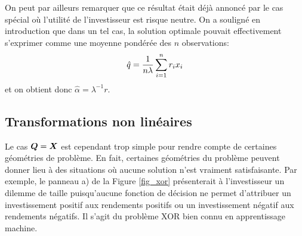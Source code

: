 On peut par ailleurs remarquer que ce résultat était déjà annoncé par le cas spécial où
l'utilité de l'investisseur est risque neutre. On a souligné en introduction que dans un
tel cas, la solution optimale pouvait effectivement s'exprimer comme une moyenne pondérée
des $n$ observations:
\begin{equation}
  \hat q = \frac{1}{n\lambda}\sum_{i=1}^n r_i x_i
\end{equation}
et on obtient donc $\hat\alpha = \lambda^{-1}r$. 



\subsection{Transformations non linéaires}



Le cas $\bm Q = \bm{X}$ est cependant trop simple pour rendre compte de certaines géométries de
problème. En fait, certaines géométries du problème peuvent donner lieu à des situations
où aucune solution n'est vraiment satisfaisante. Par exemple, le panneau a) de la Figure
\ref{fig_xor} présenterait à l'investisseur un dilemme de taille puisqu'aucune fonction de
décision ne permet d'attribuer un investissement positif aux rendements positifs ou un
investissement négatif aux rendements négatifs. Il s'agit du problème XOR bien connu en
apprentissage machine.


